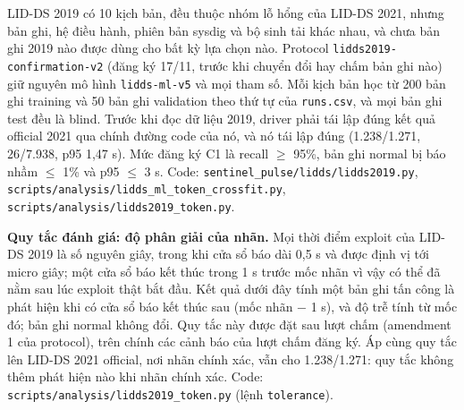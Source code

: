 LID-DS 2019 có 10 kịch bản, đều thuộc nhóm lỗ hổng của LID-DS 2021, nhưng bản ghi, hệ điều hành, phiên bản sysdig và bộ sinh tải khác nhau, và chưa bản ghi 2019 nào được dùng cho bất kỳ lựa chọn nào. Protocol \texttt{lidds2019-\allowbreak{}confirmation-\allowbreak{}v2} (đăng ký 17/11, trước khi chuyển đổi hay chấm bản ghi nào) giữ nguyên mô hình \texttt{lidds-\allowbreak{}ml-\allowbreak{}v5} và mọi tham số. Mỗi kịch bản học từ 200 bản ghi training và 50 bản ghi validation theo thứ tự của \texttt{runs.csv}, và mọi bản ghi test đều là blind. Trước khi đọc dữ liệu 2019, driver phải tái lập đúng kết quả official 2021 qua chính đường code của nó, và nó tái lập đúng (1.238/1.271, 26/7.938, p95 1,47 s). Mức đăng ký C1 là recall $\geq$ 95\%, bản ghi normal bị báo nhầm $\leq$ 1\% và p95 $\leq$ 3 s. Code: \texttt{sentinel\_\allowbreak{}pulse/\allowbreak{}lidds/\allowbreak{}lidds2019.py}, \texttt{scripts/\allowbreak{}analysis/\allowbreak{}lidds\_\allowbreak{}ml\_\allowbreak{}token\_\allowbreak{}crossfit.py}, \texttt{scripts/\allowbreak{}analysis/\allowbreak{}lidds2019\_\allowbreak{}token.py}.

\textbf{Quy tắc đánh giá: độ phân giải của nhãn.} Mọi thời điểm exploit của LID-DS 2019 là số nguyên giây, trong khi cửa sổ báo dài 0,5 s và được định vị tới micro giây; một cửa sổ báo kết thúc trong 1 s trước mốc nhãn vì vậy có thể đã nằm sau lúc exploit thật bắt đầu. Kết quả dưới đây tính một bản ghi tấn công là phát hiện khi có cửa sổ báo kết thúc sau (mốc nhãn $-$ 1 s), và độ trễ tính từ mốc đó; bản ghi normal không đổi. Quy tắc này được đặt sau lượt chấm (amendment 1 của protocol), trên chính các cảnh báo của lượt chấm đăng ký. Áp cùng quy tắc lên LID-DS 2021 official, nơi nhãn chính xác, vẫn cho 1.238/1.271: quy tắc không thêm phát hiện nào khi nhãn chính xác. Code: \texttt{scripts/\allowbreak{}analysis/\allowbreak{}lidds2019\_\allowbreak{}token.py} (lệnh \texttt{tolerance}).

